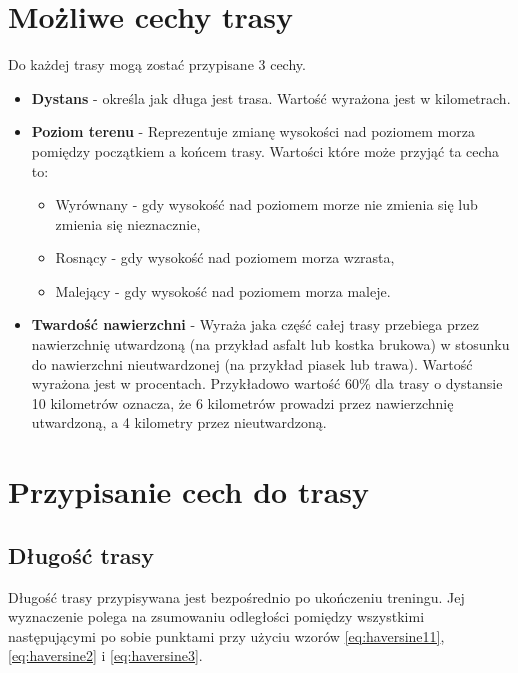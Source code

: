 \section{Możliwe cechy trasy}\label{chap:opis-cech}
Do każdej trasy mogą zostać przypisane 3 cechy.
\begin{itemize}
\item{\textbf{Dystans}} - określa jak długa jest trasa. Wartość wyrażona jest w kilometrach.
\item{\textbf{Poziom terenu}} - Reprezentuje zmianę wysokości nad poziomem morza pomiędzy początkiem a końcem trasy. Wartości które może przyjąć ta cecha to:
\begin{itemize}
\item{Wyrównany} - gdy wysokość nad poziomem morze nie zmienia się lub zmienia się nieznacznie,
\item{Rosnący} - gdy wysokość nad poziomem morza wzrasta,
\item{Malejący} - gdy wysokość nad poziomem morza maleje.
\end{itemize}
\item{\textbf{Twardość nawierzchni}} - Wyraża jaka część całej trasy przebiega przez nawierzchnię utwardzoną (na przykład asfalt lub kostka brukowa) w stosunku do nawierzchni nieutwardzonej (na przykład piasek lub trawa). Wartość wyrażona jest w procentach. Przykładowo wartość 60\% dla trasy o dystansie 10 kilometrów oznacza, że 6 kilometrów prowadzi przez nawierzchnię utwardzoną, a 4 kilometry przez nieutwardzoną.
\end{itemize}
\section{Przypisanie cech do trasy}\label{chap:przypisanie-cech}
\subsection{Długość trasy}
Długość trasy przypisywana jest bezpośrednio po ukończeniu treningu. Jej wyznaczenie polega na zsumowaniu odległości pomiędzy wszystkimi następującymi po sobie punktami przy użyciu wzorów \ref{eq:haversine11},  \ref{eq:haversine2} i \ref{eq:haversine3}.

